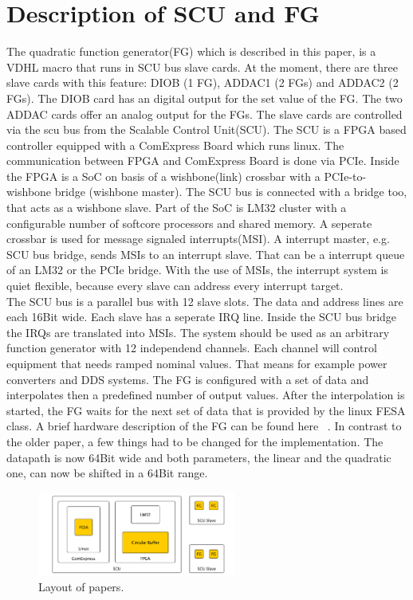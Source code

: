 \documentclass[a4paper,
              ]{jacow}
\begin{document}
\section{Description of SCU and FG}
The quadratic function generator(FG) which is described in this paper, is a VDHL macro that runs in SCU bus slave cards. At the moment, there are three slave cards with this feature: DIOB (1 FG), ADDAC1 (2 FGs) and ADDAC2 (2 FGs). The DIOB card has an digital output for the set value of the FG. The two ADDAC cards offer an analog output for the FGs. The slave cards are
controlled via the scu bus from the Scalable Control Unit(SCU). The SCU is a FPGA based controller equipped with a ComExpress Board which runs linux. The communication between FPGA and ComExpress Board is done   via PCIe. Inside the FPGA is a SoC on basis of a wishbone(link) crossbar with a PCIe-to-wishbone bridge (wishbone master). The SCU bus is connected with a bridge too, that acts as a wishbone slave. Part of the SoC is LM32 cluster with a configurable number of softcore processors and shared memory. A seperate crossbar is used for message signaled interrupts(MSI). A interrupt master, e.g. SCU bus bridge, sends MSIs to an interrupt slave. That can be a interrupt queue of an LM32 or the PCIe bridge. With the use of MSIs, the interrupt system is quiet flexible, because every slave can address every interrupt target.\\
The SCU bus is a parallel bus with 12 slave slots. The data and address lines are each 16Bit wide. Each slave has a seperate IRQ line. Inside the SCU bus bridge the IRQs are translated into MSIs.
The system should be used as an arbitrary function generator with 12 independend channels. Each channel will control equipment that needs ramped nominal values. That means for example  power converters and DDS systems.
The FG is configured with a set of data and interpolates then a predefined number of output values. After the interpolation is started, the FG waits for the next set of data that
is provided by the linux FESA class. A brief hardware description of the FG can be found here ~\cite{ref_fg_paper}. In contrast to the older paper, a few things had to be changed for the implementation.
The datapath is now 64Bit wide and both parameters, the linear and the quadratic one, can now be shifted in a 64Bit range. 

\begin{figure}[!htb]
   \centering
   \includegraphics*[width=65mm]{data_linux2fg}
   \caption{Layout of papers.}
   \label{l2ea4-f1}
\end{figure}
\end{document}
